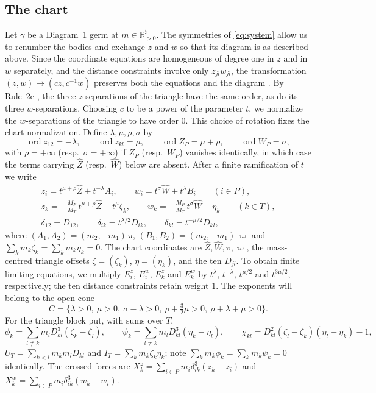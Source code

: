 \documentclass[Threeside,11pt]{article}
\theoremstyle{definition}
\theoremstyle{remark}
\numberwithin{equation}{section}
\theoremstyle{remark}
\newcommand{\Rp}{\mathbb{R}_{>0}}
\newcommand{\ord}{\operatorname{ord}}
\begin{document}
\subsection{The chart}
{Let $\gamma$ be a Diagram~1 germ at $m\in\Rp^5$.  The symmetries of
\eqref{eq:system} allow us to renumber the bodies and exchange $z$ and $w$ so that its
diagram is as described above.  Since the coordinate equations are homogeneous of degree
one in $z$ and in $w$ separately, and the distance constraints involve only $z_{jl}w_{jl}$, the transformation
$(z,w)\mapsto(cz,c^{-1}w)$ preserves both the equations and the diagram
\cite[p.~547]{AK}.
By Rule~2e \cite[p.~552]{AK}, the three $z$-separations of the triangle have the same order,
as do its three $w$-separations.  Choosing $c$ to be a power of the parameter $t$, we normalize
the $w$-separations of the triangle to have order $0$.  This choice of rotation fixes the chart normalization.  Define
$\lambda,\mu,\rho,\sigma$ by}
\[
  \ord z_{12}=-\lambda,\qquad \ord z_{kl}=\mu,\qquad \ord Z_P=\mu+\rho,\qquad \ord W_P=\sigma,
\]
with $\rho=+\infty$ (resp.\ $\sigma=+\infty$) if $Z_P$ (resp.\ $W_P$) vanishes identically, in
which case the terms carrying $\hat Z$ (resp.\ $\hat W$) below are absent.
After a finite ramification of $t$ we write
\begin{equation}\label{eq:d1-chart}
\begin{gathered}
  z_i=t^{\mu+\rho}\hat Z+t^{-\lambda}A_i,\qquad w_i=t^{\sigma}\hat W+t^{\lambda}B_i
  \qquad(i\in P),\\
  z_k=-\tfrac{M_P}{M_T}\,t^{\mu+\rho}\hat Z+t^{\mu}\zeta_k,\qquad
  w_k=-\tfrac{M_P}{M_T}\,t^{\sigma}\hat W+\eta_k\qquad(k\in T),\\
  \delta_{12}=D_{12},\qquad\delta_{ik}=t^{\lambda/2}D_{ik},\qquad\delta_{kl}=t^{-\mu/2}D_{kl},
\end{gathered}
\end{equation}
where $(A_1,A_2)=(m_2,-m_1)\,\pi$, $(B_1,B_2)=(m_2,-m_1)\,\varpi$ and
$\sum_km_k\zeta_k=\sum_km_k\eta_k=0$.  {The chart coordinates are
$\hat Z,\hat W,\pi,\varpi$, the mass-centred triangle offsets $\zeta=(\zeta_k)$,
$\eta=(\eta_k)$, and the ten $D_{jl}$.  To obtain finite limiting equations, we multiply
$E^z_i$, $E^w_i$, $E^z_k$ and $E^w_k$ by $t^{\lambda}$, $t^{-\lambda}$, $t^{\mu/2}$ and
$t^{3\mu/2}$, respectively; the ten distance constraints retain weight $1$.
The exponents will belong to the open cone}
\begin{equation}\label{eq:d1-cone}
  C=\{\lambda>0,\ \mu>0,\ \sigma-\lambda>0,\ \rho+\tfrac32\mu>0,\ \rho+\lambda+\mu>0\}.
\end{equation}
For the triangle block put, with sums over $T$,
\[
  \phi_k=\sum_{l\ne k}m_lD_{kl}^3(\zeta_k-\zeta_l),\qquad
  \psi_k=\sum_{l\ne k}m_lD_{kl}^3(\eta_k-\eta_l),\qquad
  \chi_{kl}=D_{kl}^2(\zeta_l-\zeta_k)(\eta_l-\eta_k)-1,
\]
$U_T=\sum_{k<l}m_km_lD_{kl}$ and $I_T=\sum_km_k\zeta_k\eta_k$; note
$\sum_km_k\phi_k=\sum_km_k\psi_k=0$ identically.  The crossed forces are
$X^z_k=\sum_{i\in P}m_i\delta_{ik}^3(z_k-z_i)$ and $X^w_k=\sum_{i\in P}m_i\delta_{ik}^3(w_k-w_i)$.
\end{document}
